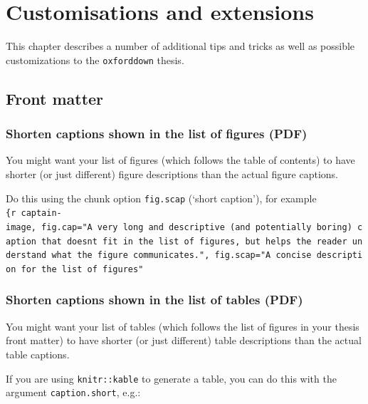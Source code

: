\documentclass[a4paper, twoside]{templates/ociamthesis}
\begin{document}
\hypertarget{customisations-and-extensions}{%
\chapter{Customisations and extensions}\label{customisations-and-extensions}}

\minitoc 

\noindent This chapter describes a number of additional tips and tricks as well as possible customizations to the \texttt{oxforddown} thesis.

\hypertarget{front-matter}{%
\section{Front matter}\label{front-matter}}

\hypertarget{shorten-captions-shown-in-the-list-of-figures-pdf}{%
\subsection{Shorten captions shown in the list of figures (PDF)}\label{shorten-captions-shown-in-the-list-of-figures-pdf}}

You might want your list of figures (which follows the table of contents) to have shorter (or just different) figure descriptions than the actual figure captions.

Do this using the chunk option \texttt{fig.scap} (`short caption'), for example \texttt{\{r\ captain-image,\ fig.cap="A\ very\ long\ and\ descriptive\ (and\ potentially\ boring)\ caption\ that\ doesn\textquotesingle{}t\ fit\ in\ the\ list\ of\ figures,\ but\ helps\ the\ reader\ understand\ what\ the\ figure\ communicates.",\ fig.scap="A\ concise\ description\ for\ the\ list\ of\ figures"}

\hypertarget{shorten-captions-shown-in-the-list-of-tables-pdf}{%
\subsection{Shorten captions shown in the list of tables (PDF)}\label{shorten-captions-shown-in-the-list-of-tables-pdf}}

You might want your list of tables (which follows the list of figures in your thesis front matter) to have shorter (or just different) table descriptions than the actual table captions.

If you are using \texttt{knitr::kable} to generate a table, you can do this with the argument \texttt{caption.short}, e.g.:
\end{document}
